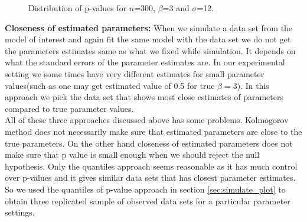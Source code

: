 \documentclass[11pt]{article}
\begin{document}
\begin{figure}[hbtp]
   \centering
       \caption{Distribution of p-values for $n$=300, $\beta$=3 and $\sigma$=12.}
       \label{fig:dist_pvalue}
\end{figure}

{\bf Closeness of estimated parameters:} When we simulate a data set from the model of interest and again fit the same model with the data set we do not get the parameters estimates same as what we fixed while simulation. It depends on what the standard errors of the parameter estimates are. In our experimental setting we some times have very different estimates for small parameter values(such as one may get estimated value of 0.5 for true $\beta=3$). In this approach we pick the data set that shows most close estimates of parameters compared to true parameter values.\\

All of these three approaches discussed above has some problems. Kolmogorov method does not necessarily make sure that estimated parameters are close to the true parameters. On the other hand closeness of estimated parameters does not make sure that p value is small enough when we should reject the null hypothesis. Only the quantiles approach seems reasonable as it has much control over p-values and it gives similar data sets that has closest parameter estimates. So we used the quantiles of p-value approach in section \ref{sec:simulate_plot} to obtain three replicated sample of observed data sets for a particular parameter settings.\\
\end{document}

